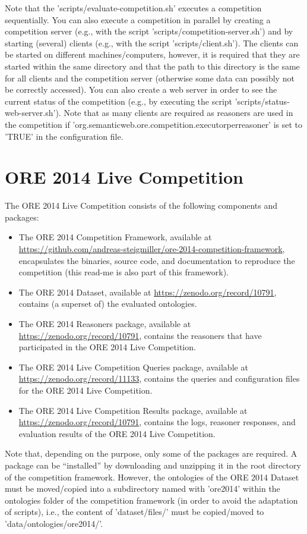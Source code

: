 \documentclass{article}
\begin{document}
Note that the 'scripts/evaluate-competition.sh' executes a competition sequentially. 
You can also execute a competition in parallel by creating a competition server (e.g., with the script 'scripts/competition-server.sh') and by starting (several) clients (e.g., with the script 'scripts/client.sh').
The clients can be started on different machines/computers, however, it is required that they are started within the same directory and that the path to this directory is the same for all clients and the competition server (otherwise some data can possibly not be correctly accessed).
You can also create a web server in order to see the current status of the competition (e.g., by executing the script 'scripts/status-web-server.sh').
Note that as many clients are required as reasoners are used in the competition if 'org.semanticweb.ore.competition.executorperreasoner' is set to 'TRUE' in the configuration file.


\section{ORE 2014 Live Competition}


The ORE 2014 Live Competition consists of the following components and packages:
\begin{itemize}
\item The ORE 2014 Competition Framework, available at \url{https://github.com/andreas-steigmiller/ore-2014-competition-framework}, encapsulates the binaries, source code, and documentation to reproduce the competition (this read-me is also part of this framework).
\item The ORE 2014 Dataset, available at \url{https://zenodo.org/record/10791}, contains (a superset of) the evaluated ontologies.
\item The ORE 2014 Reasoners package, available at \url{https://zenodo.org/record/10791}, contains the reasoners that have participated in the ORE 2014 Live Competition.
\item The ORE 2014 Live Competition Queries package, available at \url{https://zenodo.org/record/11133}, contains the queries and configuration files for the ORE 2014 Live Competition.
\item The ORE 2014 Live Competition Results package, available at \url{https://zenodo.org/record/10791}, contains the logs, reasoner responses, and evaluation results of the ORE 2014 Live Competition.
\end{itemize}

Note that, depending on the purpose, only some of the packages are required. 
A package can be ``installed'' by downloading and unzipping it in the root directory of the competition framework.
However, the ontologies of the ORE 2014 Dataset must be moved/copied into a subdirectory named with 'ore2014' within the ontologies folder of the competition framework (in order to avoid the adaptation of scripts), i.e., the content of 'dataset/files/' must be copied/moved to 'data/ontologies/ore2014/'.
\end{document}
